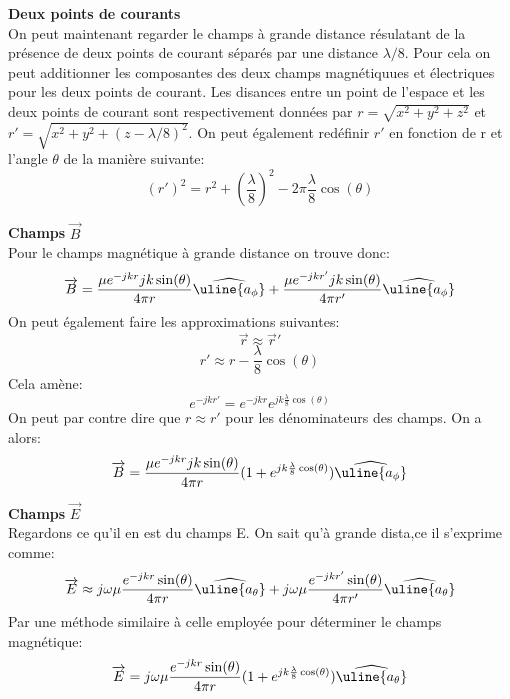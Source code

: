 \documentclass[10pt,a4paper]{article}
\newcommand{\V}[1]{\overrightarrow{#1}}
\newcommand{\Base}[1]{\widehat{\uline{a_{#1}}}} %
\begin{document}
\indent \textbf{Deux points de courants}\\
On peut maintenant regarder le champs à grande distance résulatant de la présence de deux points de courant séparés par une distance $\lambda /8$. Pour cela on peut additionner les composantes des deux champs magnétiquues et électriques pour les deux points de courant. Les disances entre un point de l'espace et les deux points de courant sont respectivement données par $r=\sqrt{x^2+y^2+z^2}$ et $r'=\sqrt{x^2+y^2+(z-\lambda /8)^2}$. On peut également redéfinir $r'$ en fonction de r et l'angle $\theta$ de la manière suivante:
$$ (r')^2=r^2+\left( \dfrac{\lambda}{8}\right)^2-2\pi \dfrac{\lambda}{8}\cos (\theta )$$

\textbf{Champs} $\overrightarrow{B}$\\
Pour le champs magnétique à grande distance on trouve donc:
\begin{equation}
\overrightarrow{B}= \frac{\mu e^{-jkr} jk \sin (\theta )}{4 \pi r} \Base{\phi} + \frac{\mu e^{-jkr'} jk \sin (\theta )}{4 \pi r'} \Base{\phi}
\end{equation}
On peut également faire les approximations suivantes:
$$\V{r}\approx \V{r}'$$
$$r'\approx r-\frac{\lambda}{8}\cos (\theta)$$
Cela amène:
$$e^{-jkr'}=e^{-jkr}e^{jk\frac{\lambda}{8}\cos (\theta)}$$
On peut par contre dire que $r\approx r'$ pour les dénominateurs des champs. On a alors:
\begin{equation}
\overrightarrow{B}= \dfrac{\mu e^{-jkr} jk \sin (\theta )}{4 \pi r}(1+e^{jk\frac{\lambda}{8}\cos (\theta)}) \Base{\phi}
\end{equation}

\textbf{Champs} $\overrightarrow{E}$\\
Regardons ce qu'il en est du champs E. On sait qu'à grande dista,ce il s'exprime comme:
\begin{equation}
\overrightarrow{E}\approx j\omega \mu \frac{e^{-jkr} \sin (\theta )}{4 \pi r} \Base{\theta}+j\omega \mu \frac{e^{-jkr'} \sin (\theta )}{4 \pi r'} \Base{\theta}
\end{equation}
Par une méthode similaire à celle employée pour déterminer le champs magnétique:
\begin{equation}
\overrightarrow{E}= j\omega \mu \frac{e^{-jkr} \sin (\theta )}{4 \pi r}(1+e^{jk\frac{\lambda}{8}\cos (\theta)}) \Base{\theta}
\end{equation}
\end{document}
